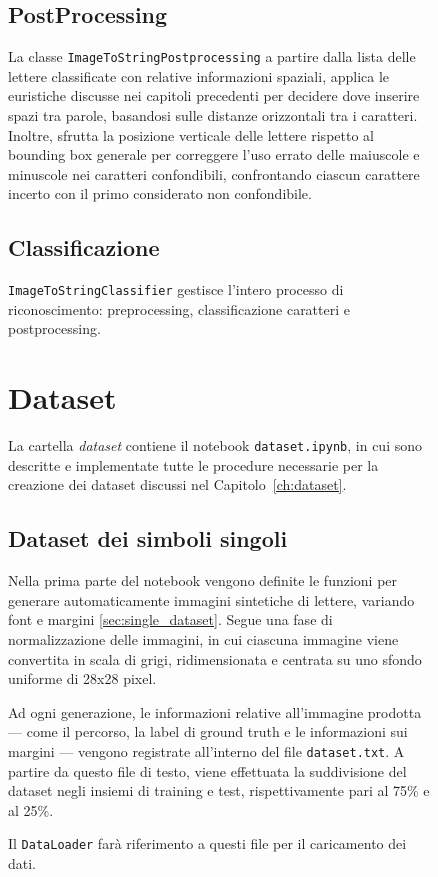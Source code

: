 \begin{figure}[H]
\subsection*{PostProcessing}
La classe \texttt{ImageToStringPostprocessing} a partire dalla lista delle lettere classificate con relative informazioni spaziali, applica le euristiche discusse nei capitoli precedenti per decidere dove inserire spazi tra parole, basandosi sulle distanze orizzontali tra i caratteri. Inoltre, sfrutta la posizione verticale delle lettere rispetto al bounding box generale per correggere l'uso errato delle maiuscole e minuscole nei caratteri confondibili, confrontando ciascun carattere incerto con il primo considerato non confondibile.

\subsection*{Classificazione}
\texttt{ImageToStringClassifier} gestisce l'intero processo di riconoscimento: preprocessing, classificazione caratteri e postprocessing.

\section{Dataset}
La cartella \emph{dataset} contiene il notebook \texttt{dataset.ipynb}, in cui sono descritte e implementate tutte le procedure necessarie per la creazione dei dataset discussi nel Capitolo~\ref{ch:dataset}.

\subsection*{Dataset dei simboli singoli}
Nella prima parte del notebook vengono definite le funzioni per generare automaticamente immagini sintetiche di lettere, variando font e margini \ref{sec:single_dataset}.  
Segue una fase di normalizzazione delle immagini, in cui ciascuna immagine viene convertita in scala di grigi, ridimensionata e centrata su uno sfondo uniforme di 28x28 pixel.

Ad ogni generazione, le informazioni relative all'immagine prodotta — come il percorso, la label di ground truth e le informazioni sui margini — vengono registrate all'interno del file \texttt{dataset.txt}.
A partire da questo file di testo, viene effettuata la suddivisione del dataset negli insiemi di training e test, rispettivamente pari al 75\% e al 25\%.

Il \texttt{DataLoader} farà riferimento a questi file per il caricamento dei dati.


\end{figure}
